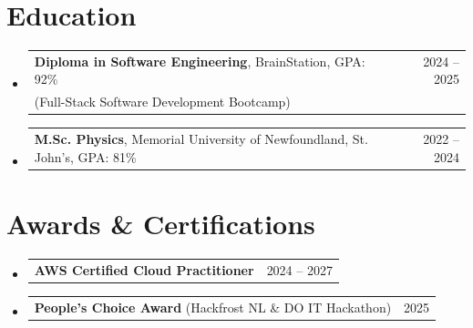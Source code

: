 \documentclass[letterpaper,10pt]{article}
\makeatletter
\newcommand{\resumeProjectHeading}[2]{
    \item
    \begin{tabular*}{0.97\textwidth}{l@{\extracolsep{\fill}}r}
      #1 & {\small #2} \\
    \end{tabular*}\vspace{-7pt}
}
\newcommand{\resumeSubHeadingListStart}{\begin{itemize}[leftmargin=0.15in, label={}]}
\newcommand{\resumeSubHeadingListEnd}{\end{itemize}}
\makeatother
\begin{document}
\section{Education}
  \resumeSubHeadingListStart
    \resumeProjectHeading %
        {\textbf{Diploma in Software Engineering}, BrainStation, GPA: 92\% & {\small 2024 -- 2025} \\
         \footnotesize (Full-Stack Software Development Bootcamp)}{}
        \vspace{4pt}
    \resumeProjectHeading
        {\textbf{M.Sc. Physics}, Memorial University of Newfoundland, St. John's, GPA: 81\%}{2022 -- 2024}
  \resumeSubHeadingListEnd
  \vspace{-3pt} %

\section{Awards \& Certifications}
  \resumeSubHeadingListStart
    \resumeProjectHeading
        {\textbf{AWS Certified Cloud Practitioner}}{2024 -- 2027}
    \resumeProjectHeading
        {\textbf{People's Choice Award} (Hackfrost NL \& DO IT Hackathon)}{2025}
  \resumeSubHeadingListEnd
\end{document}
